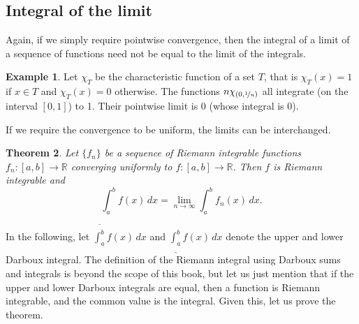 \documentclass[12pt,openany]{book}
\newcommand{\R}{{\mathbb{R}}}
\theoremstyle{plain}
\newtheorem{thm}{Theorem}[section]
\theoremstyle{remark}
\theoremstyle{definition}
\theoremstyle{exercise}
\theoremstyle{example}
\newtheorem{example}[thm]{Example}
\begin{document}
\subsection{Integral of the limit}

Again, if we simply require pointwise convergence, then the integral
of a limit of a sequence of functions need not be equal to the limit
of the integrals.

\begin{example}
Let $\chi_{T}$ be the characteristic function of a set $T$, that is $\chi_T(x) =
1$ if $x \in T$ and $\chi_T(x) = 0$ otherwise.
The functions $n \chi_{(0,\nicefrac{1}{n})}$ all integrate (on the interval
$[0,1]$) to 1.  Their
pointwise limit is 0 (whose integral is 0).
\end{example}

If we require the convergence to be uniform, the limits can
be interchanged.

\begin{thm} \label{integralinterchange:thm}
Let $\{ f_n \}$ be a sequence of Riemann integrable
functions
$f_n \colon [a,b] \to \R$
converging uniformly to $f \colon [a,b]
\to \R$.  Then $f$ is Riemann integrable and
\begin{equation*}
\int_a^b f(x) \, dx = \lim_{n\to\infty} \int_a^b f_n(x) \, dx .
\end{equation*}
\end{thm}

In the following, let 
$\overline{\int_a^b} f(x)\, dx$ and 
$\underline{\int_a^b} f(x)\, dx$ denote the upper and lower Darboux integral.
The definition of the Riemann integral using Darboux sums and integrals is
beyond the scope of this book, but let us just mention that 
if the upper and lower Darboux integrals are equal, then a function is
Riemann integrable, and the common value is the integral.  Given this,
let us prove the theorem.
\end{document}
